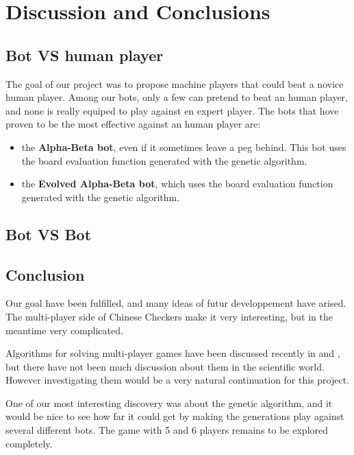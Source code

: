 \section{Discussion and Conclusions}
\subsection{Bot VS human player}
The goal of our project was to propose machine players that could beat a
novice human player. Among our bots, only a few can pretend to beat an human
player, and none is really equiped to play against en expert player. The bots
that hove proven to be the most effective against an human player are:
\begin{itemize}
  \item the \textbf{Alpha-Beta bot}, even if it sometimes leave a peg behind.
        This bot uses the board evaluation function generated with the genetic
        algorithm.
  \item the \textbf{Evolved Alpha-Beta bot}, which uses the board evaluation
        function generated with the genetic algorithm.
\end{itemize}

\subsection{Bot VS Bot}

\subsection{Conclusion}
Our goal have been fulfilled, and many ideas of futur developpement have
arised. The multi-player side of Chinese Checkers make it very interesting,
but in the meantime very complicated.

Algorithms for solving multi-player games have been discussed recently in
\cite{Hashavit} and \cite{bestreplysearch}, but there have not been much
discussion about them in the scientific world. However investigating them
would be a very natural continuation for this project.

One of our most interesting discovery was about the genetic algorithm, and
it would be nice to see how far it could get by making the generations play
against several different bots. The game with 5 and 6 players remains to be
explored completely.


